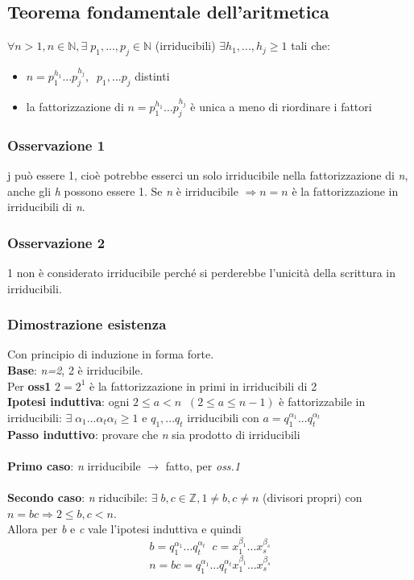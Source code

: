 \subsection{Teorema fondamentale dell'aritmetica}
\(\forall n>1, n\in\mathbb{N},\exists\;p_1,...,p_j\in\mathbb{N}\) (irriducibili) \(\exists h_1,...,h_j\geq 1\) tali che:
\begin{itemize}
    \item \(n=p_1^{h_1}...p_j^{h_j},\;\;p_1,...p_j\) distinti
    \item la fattorizzazione di \(n=p_1^{h_1}...p_j^{h_j}\) è unica a meno di riordinare i fattori
\end{itemize}

\subsubsection{Osservazione 1}
j può essere 1, cioè potrebbe esserci un solo irriducibile nella fattorizzazione di \textit{n}, anche gli \textit{h} possono essere 1.
Se \textit{n} è irriducibile \(\Rightarrow n=n\) è la fattorizzazione in irriducibili di \textit{n}.

\subsubsection{Osservazione 2}
1 non è considerato irriducibile perché si perderebbe l'unicità della scrittura in irriducibili.

\subsubsection{Dimostrazione esistenza}
Con principio di induzione in forma forte.
\\
\textbf{Base}: \textit{n=2}, 2 è irriducibile.
\\
Per \textbf{oss1} \(2=2^1\) è la fattorizzazione in primi in irriducibili di 2
\\
\textbf{Ipotesi induttiva}: ogni \(2\leq a<n\;\;(2\leq a\leq n-1)\) è fattorizzabile in irriducibili: \(\exists\; \alpha _1...\alpha _t \alpha _i\geq 1\) e \(q_1,...q_t\) irriducibili con \(a=q^{\alpha _1}_1...q_t^{\alpha _t}\)
\\
\textbf{Passo induttivo}: provare che \textit{n} sia prodotto di irriducibili
\\\\
\textbf{Primo caso}: \textit{n} irriducibile \(\rightarrow\) fatto, per \textit{oss.1}
\\\\
\textbf{Secondo caso}: \textit{n} riducibile: \(\exists\;b,c\in\mathbb{Z}, 1\neq b, c\neq n\) (divisori propri) con \(n=bc\Rightarrow 2\leq b,c<n\).
\\
Allora per \textit{b} e \textit{c} vale l'ipotesi induttiva e quindi
\[b=q_1^{\alpha _1}...q_t^{\alpha _t}\;\; c= x_1^{\beta _1}...x_s^{\beta _s}\]
\[n=bc=q_1^{\alpha _1}...q_t^{\alpha _t} x_1^{\beta _1}...x_s^{\beta _s}\]

